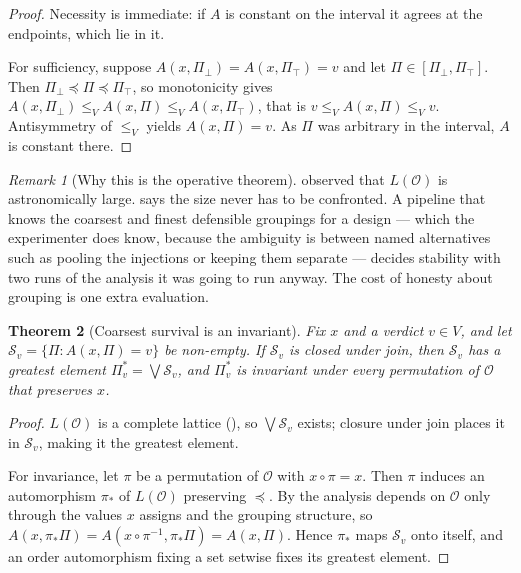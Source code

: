 \documentclass[11pt,a4paper]{article}
\newtheorem{theorem}{Theorem}[section]
\theoremstyle{definition}
\theoremstyle{remark}
\newtheorem{remark}[theorem]{Remark}
\newcommand{\Obs}{\mathcal{O}}               %
\newcommand{\Part}{\Pi}                      %
\begin{document}
\begin{proof}
Necessity is immediate: if $A$ is constant on the interval it agrees at
the endpoints, which lie in it.

For sufficiency, suppose $A(x,\Part_{\bot}) = A(x,\Part_{\top}) = v$ and
let $\Part \in [\Part_{\bot},\Part_{\top}]$. Then
$\Part_{\bot} \preceq \Part \preceq \Part_{\top}$, so monotonicity gives
$A(x,\Part_{\bot}) \leq_V A(x,\Part) \leq_V A(x,\Part_{\top})$, that is
$v \leq_V A(x,\Part) \leq_V v$. Antisymmetry of $\leq_V$ yields
$A(x,\Part) = v$. As $\Part$ was arbitrary in the interval, $A$ is
constant there.
\end{proof}

\begin{remark}[Why this is the operative theorem]\label{rem:operative}
 observed that $L(\Obs)$ is astronomically large.
 says the size never has to be confronted. A pipeline
that knows the coarsest and finest defensible groupings for a design ---
which the experimenter does know, because the ambiguity is between named
alternatives such as pooling the injections or keeping them separate ---
decides stability with two runs of the analysis it was going to run
anyway. The cost of honesty about grouping is one extra evaluation.
\end{remark}

\begin{theorem}[Coarsest survival is an invariant]\label{thm:coarsest-invariant}
Fix $x$ and a verdict $v \in V$, and let
$\mathcal{S}_v = \{\Part : A(x,\Part) = v\}$ be non-empty. If
$\mathcal{S}_v$ is closed under join, then $\mathcal{S}_v$ has a greatest
element $\Part^{\ast}_v = \bigvee \mathcal{S}_v$, and $\Part^{\ast}_v$ is
invariant under every permutation of $\Obs$ that preserves $x$.
\end{theorem}

\begin{proof}
$L(\Obs)$ is a complete lattice (), so
$\bigvee \mathcal{S}_v$ exists; closure under join places it in
$\mathcal{S}_v$, making it the greatest element.

For invariance, let $\pi$ be a permutation of $\Obs$ with
$x \circ \pi = x$. Then $\pi$ induces an automorphism $\pi_{\ast}$ of
$L(\Obs)$ preserving $\preceq$. By  the analysis
depends on $\Obs$ only through the values $x$ assigns and the grouping
structure, so $A(x,\pi_{\ast}\Part) = A(x \circ \pi^{-1},\pi_{\ast}\Part)
= A(x,\Part)$. Hence $\pi_{\ast}$ maps $\mathcal{S}_v$ onto itself, and
an order automorphism fixing a set setwise fixes its greatest element.
\end{proof}
\end{document}
